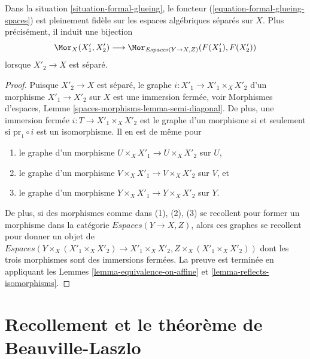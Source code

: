 \begin{lemma}
\label{lemma-fully-faithful-on-separated}
Dans la situation \ref{situation-formal-glueing}, le foncteur
(\ref{equation-formal-glueing-spaces}) est pleinement fidèle
sur les espaces algébriques séparés sur $X$. Plus précisément, il induit
une bijection
$$
\Mor_X(X'_1, X'_2)
\longrightarrow
\Mor_{\textit{Espaces}(Y \to X, Z)}(F(X'_1), F(X'_2))
$$
lorsque $X'_2 \to X$ est séparé.
\end{lemma}

\begin{proof}
Puisque $X'_2 \to X$ est séparé, le graphe $i : X'_1 \to X'_1 \times_X X'_2$
d'un morphisme $X'_1 \to X'_2$ sur $X$ est une immersion fermée, voir
Morphismes d'espaces, Lemme \ref{spaces-morphisms-lemma-semi-diagonal}.
De plus, une immersion fermée $i : T \to X'_1 \times_X X'_2$ est le graphe d'un
morphisme si et seulement si $\text{pr}_1 \circ i$ est un isomorphisme.
Il en est de même pour
\begin{enumerate}
\item le graphe d'un morphisme $U \times_X X'_1 \to U \times_X X'_2$ sur $U$,
\item le graphe d'un morphisme $V \times_X X'_1 \to V \times_X X'_2$ sur $V$,
et
\item le graphe d'un morphisme $Y \times_X X'_1 \to Y \times_X X'_2$ sur $Y$.
\end{enumerate}
De plus, si des morphismes comme dans (1), (2), (3) se recollent pour former un
morphisme dans la catégorie $\textit{Espaces}(Y \to X, Z)$, alors ces
graphes se recollent pour donner un objet de
$\textit{Espaces}(Y \times_X (X'_1 \times_X X'_2) \to X'_1 \times_X X'_2,
Z \times_X (X'_1 \times_X X'_2))$
dont les trois morphismes sont des immersions fermées. La preuve est terminée en appliquant les Lemmes \ref{lemma-equivalence-on-affine} et \ref{lemma-reflects-isomorphisms}. 
\end{proof}









\section{Recollement et le théorème de Beauville-Laszlo}
\label{section-glueing-beauville-laszlo}

